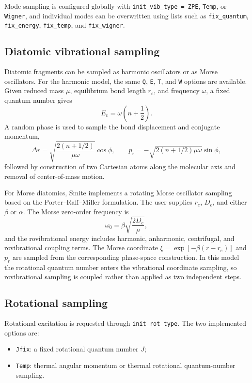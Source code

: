 \documentclass[11pt]{article}
\begin{document}
Mode sampling is configured globally with \texttt{init\_vib\_type = ZPE}, \texttt{Temp}, or \texttt{Wigner}, and individual modes can be overwritten using lists such as \texttt{fix\_quantum}, \texttt{fix\_energy}, \texttt{fix\_temp}, and \texttt{fix\_wigner}.

\subsection{Diatomic vibrational sampling}

Diatomic fragments can be sampled as harmonic oscillators or as Morse oscillators.  For the harmonic model, the same \texttt{Q}, \texttt{E}, \texttt{T}, and \texttt{W} options are available.  Given reduced mass $\mu$, equilibrium bond length $r_e$, and frequency $\omega$, a fixed quantum number gives
\begin{equation}
  E_v = \omega\left(n+\frac{1}{2}\right).
\end{equation}
A random phase is used to sample the bond displacement and conjugate momentum,
\begin{equation}
  \Delta r =
  \sqrt{\frac{2(n+1/2)}{\mu\omega}}\cos\phi,
  \qquad
  p_r =
  -\sqrt{2(n+1/2)\mu\omega}\sin\phi,
\end{equation}
followed by construction of two Cartesian atoms along the molecular axis and removal of center-of-mass motion.

For Morse diatomics, Smite implements a rotating Morse oscillator sampling based on the Porter--Raff--Miller formulation.  The user supplies $r_e$, $D_e$, and either $\beta$ or $\alpha$.  The Morse zero-order frequency is
\begin{equation}
  \omega_0=\beta\sqrt{\frac{2D_e}{\mu}},
\end{equation}
and the rovibrational energy includes harmonic, anharmonic, centrifugal, and rovibrational coupling terms.  The Morse coordinate $\xi=\exp[-\beta(r-r_e)]$ and $p_r$ are sampled from the corresponding phase-space construction.  In this model the rotational quantum number enters the vibrational coordinate sampling, so rovibrational sampling is coupled rather than applied as two independent steps.

\subsection{Rotational sampling}

Rotational excitation is requested through \texttt{init\_rot\_type}.  The two implemented options are:
\begin{itemize}
  \item \texttt{Jfix}: a fixed rotational quantum number $J$;
  \item \texttt{Temp}: thermal angular momentum or thermal rotational quantum-number sampling.
\end{itemize}
\end{document}
